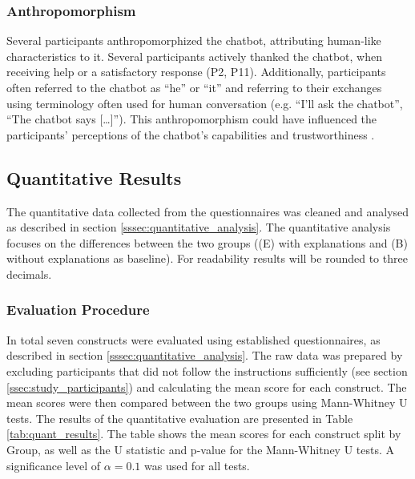 \subsubsection{Anthropomorphism} \label{sssec:anthropomorphism}

Several participants anthropomorphized the chatbot, attributing human-like characteristics to it. Several participants actively thanked the chatbot, when receiving help or a satisfactory response (P2, P11). Additionally, participants often referred to the chatbot as “he” or “it” and referring to their exchanges using terminology often used for human conversation (e.g. “I'll ask the chatbot”, “The chatbot says [\dots]”). This anthropomorphism could have influenced the participants' perceptions of the chatbot's capabilities and trustworthiness \parencite{Li2022}.

\subsection{Quantitative Results} \label{ssec:quant_results}

The quantitative data collected from the questionnaires was cleaned and analysed as described in section \ref{sssec:quantitative_analysis}. The quantitative analysis focuses on the differences between the two groups ((E) with explanations and (B) without explanations as baseline).
For readability results will be rounded to three decimals.

\subsubsection{Evaluation Procedure} \label{sssec:eval_procedure}


In total seven constructs were evaluated using established questionnaires, as described in section \ref{sssec:quantitative_analysis}. The raw data was prepared by excluding participants that did not follow the instructions sufficiently (see section \ref{ssec:study_participants}) and calculating the mean score for each construct. The mean scores were then compared between the two groups using Mann-Whitney U tests. The results of the quantitative evaluation are presented in Table \ref{tab:quant_results}. The table shows the mean scores for each construct split by Group, as well as the U statistic and p-value for the Mann-Whitney U tests. A significance level of $\alpha = 0.1$ was used for all tests.

